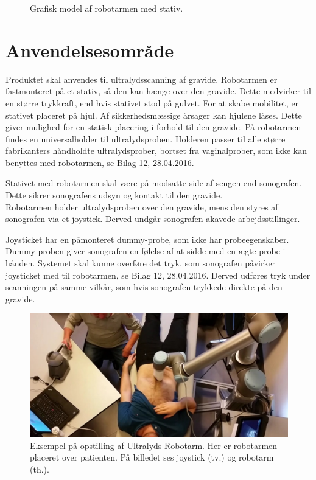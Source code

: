 \begin{figure}[H]
\begin{minipage}{0.58\textwidth}
		\caption{Grafisk model af robotarmen med stativ.}
		\label{Robotstativ}
	\end{minipage}
\end{figure}

\section{Anvendelsesområde}
Produktet skal anvendes til ultralydsscanning af gravide. Robotarmen er fastmonteret på et stativ, så den kan hænge over den gravide. Dette medvirker til en større trykkraft, end hvis stativet stod på gulvet. For at skabe mobilitet, er stativet placeret på hjul. Af sikkerhedsmæssige årsager kan hjulene låses. Dette giver mulighed for en statisk placering i forhold til den gravide. På robotarmen findes en universalholder til ultralydsproben. Holderen passer til alle større fabrikanters håndholdte ultralydsprober, bortset fra vaginalprober, som ikke kan benyttes med robotarmen, se Bilag 12, 28.04.2016.

Stativet med robotarmen skal være på modsatte side af sengen end sonografen. Dette sikrer sonografens udsyn og kontakt til den gravide. \\
Robotarmen holder ultralydsproben over den gravide, mens den styres af sonografen via et joystick. Derved undgår sonografen akavede arbejdsstillinger.

Joysticket har en påmonteret dummy-probe, som ikke har probeegenskaber. Dummy-proben giver sonografen en følelse af at sidde med en ægte probe i hånden.
Systemet skal kunne overføre det tryk, som sonografen påvirker joysticket med til robotarmen, se Bilag 12, 28.04.2016. Derved udføres tryk under scanningen på samme vilkår, som hvis sonografen trykkede direkte på den gravide.
 

\begin{figure}[H]\centering
	\includegraphics[width = 1.0\textwidth]{Figurer/ergonomiskLosning.jpg}
	\caption{Eksempel på opstilling af Ultralyds Robotarm. Her er robotarmen placeret over patienten. På billedet ses joystick (tv.) og robotarm (th.).  }
	\label{ergonomiskLosning}
\end{figure}

